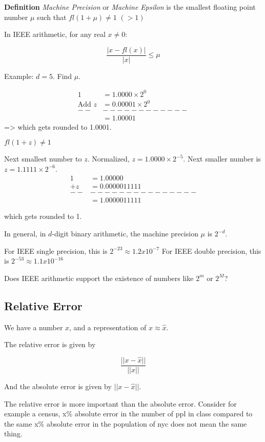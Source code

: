 \textbf{Definition} \emph{Machine Precision} or \emph{Machine Epsilon}
is the smallest floating point number $\mu$ such that $fl(1+\mu) \neq 1$ $(> 1)$

In IEEE arithmetic, for any real $x \neq 0$:

$$
\frac{|x - fl(x)|}{|x|} \le \mu
$$

Example: $d=5$. Find $\mu$. 

\begin{align*}
1 &= 1.0000 \times 2^0\\
\text{Add }z &= 0.00001 \times 2^0\\
--&------------\\
&=1.00001  
\end{align*}
=> which gets rounded to 1.0001. 

$fl(1+z) \neq 1$

Next smallest number to $z$. Normalized, $z = 1.0000\times 2^{-5}$. Next smaller number is $z = 1.1111 \times 2^{-6}$. 
\begin{align*}
1&= 1.00000\\
 +z&=0.0000011111\\
--&---------------\\
&=1.0000011111
\end{align*}
 

which gets rounded to 1.

In general, in $d$-digit binary arithmetic, the machine precision $\mu$ is
$2^{-d}$. 

For IEEE single precision, this is $2^{-23} \approx 1.2 x 10^{-7}$
For IEEE double precision, this is $2^{-53} \approx 1.1 x 10^{-16}$

Does IEEE arithmetic support the existence of numbers like $2^m$ or $2^M$?
\subsection{Relative Error}

We have a number $x$, and a representation of $x \approx \hat{x}$.

The relative error is given by

\[
\frac{||x - \hat{x}||}{||x||}
\]

And the absolute error is given by $||x - \hat{x}||$. 

The relative error is more important than the absolute error. Consider
for example a census, x\% absolute error in the number of ppl in class
compared to the same x\% absolute error in the population of nyc does
not mean the same thing.


